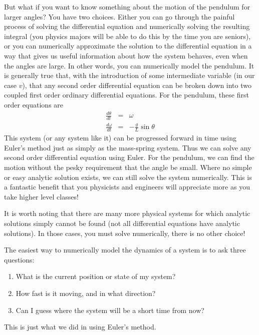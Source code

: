 \documentclass[twoside,11pt,ShortChapTitles]{BYUTextbook}
\begin{document}
But what if you want to know something about the motion of the pendulum for
larger angles? You have two choices. Either you can go through the painful
process of solving the differential equation and numerically solving the
resulting integral (you physics majors will be able to do this by the time
you are seniors), or you can numerically approximate the solution to the
differential equation in a way that gives us useful information about how
the system behaves, even when the angles are large. In other words, you can
numerically model the pendulum. It is generally true that, with the
introduction of some intermediate variable (in our case $v$), that any
second order differential equation can be broken down into two coupled first
order ordinary differential equations. For the pendulum, these first order
equations are 
\begin{eqnarray*}
\frac{d\theta }{dt} &=&\omega \\
\frac{d\omega }{dt} &=&-\frac{g}{L}\sin \theta
\end{eqnarray*}%
This system (or any system like it) can be progressed forward in time using
Euler's method just as simply as the mass-spring system. Thus we can solve
any second order differential equation using Euler. For the pendulum, we can
find the motion without the pesky requirement that the angle be small. Where
no simple or easy analytic solution exists, we can still solve the system
numerically. This is a fantastic benefit that you physicists and engineers
will appreciate more as you take higher level classes!

It is worth noting that there are many more physical systems for which
analytic solutions simply cannot be found (not all differential equations
have analytic solutions). In those cases, you must solve numerically, there
is no other choice!

The easiest way to numerically model the dynamics of a system is to ask
three questions:

\begin{enumerate}
\item What is the current position or state of my system?

\item How fast is it moving, and in what direction?

\item Can I guess where the system will be a short time from now?
\end{enumerate}

This is just what we did in using Euler's method.
\end{document}

